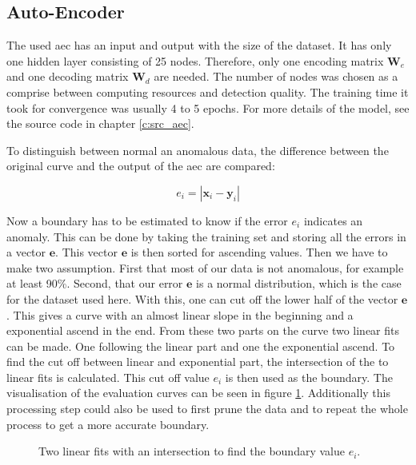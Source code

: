 	\subsection{Auto-Encoder}
	The used \ac{aec} has an input and output with the size of the dataset. It has only one hidden layer consisting of 25 nodes. Therefore, only one encoding matrix $\mathbf{W}_e$ and one decoding matrix $\mathbf{W}_d$ are needed. The number of nodes was chosen as a comprise between computing resources and detection quality. The training time it took for convergence was usually 4 to 5 epochs. For more details of the model, see the source code in chapter \ref{c:src_aec}.
	
	To distinguish between normal an anomalous data, the difference between the original curve and the output of the \ac{aec} are compared:
	
	\begin{equation*}
	e_i = \left| \mathbf{x}_i - \mathbf{y}_i \right|
	\end{equation*}
	
	Now a boundary has to be estimated to know if the error $e_i$ indicates an anomaly. This can be done by taking the training set and storing all the errors in a vector $\mathbf{e}$. This vector $\mathbf{e}$ is then sorted for ascending values. Then we have to make two assumption. First that most of our data is not anomalous, for example at least 90\%. Second, that our error $\mathbf{e}$ is a normal distribution, which is the case for the dataset used here. \newline
	With this, one can cut off the lower half of the vector $\mathbf{e}$. This gives a curve with an almost linear slope in the beginning and a exponential ascend in the end. From these two parts on the curve two linear fits can be made. One following the linear part and one the exponential ascend. To find the cut off between linear and exponential part, the intersection of the to linear fits is calculated. This cut off value $e_i$ is then used as the boundary. The visualisation of the evaluation curves can be seen in figure \ref{f:cutoff}. \newline
	Additionally this processing step could also be used to first prune the data and to repeat the whole process to get a more accurate boundary.
	
	\begin{figure}[htb]
	\centering
	
	\caption{Two linear fits with an intersection to find the boundary value $e_i$.}
	\label{f:cutoff}
	\end{figure}
	
